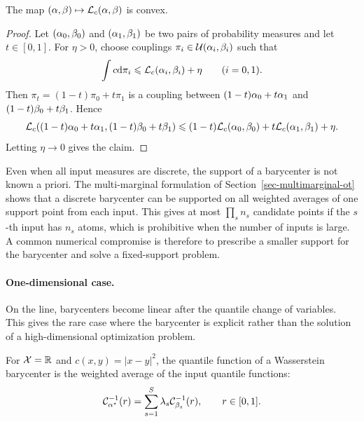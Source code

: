 \begin{prop}\label{prop-barycenter-ot-cost-convexity}
	The map $(\alpha,\beta)\mapsto\mathcal{L}_c(\alpha,\beta)$ is convex.
\end{prop}

\begin{proof}
	Let $(\alpha_0,\beta_0)$ and $(\alpha_1,\beta_1)$ be two pairs of probability measures and let $t\in[0,1]$. For $\eta>0$, choose couplings $\pi_i\in\mathcal{U}(\alpha_i,\beta_i)$ such that
	\[
		\int c\mathrm{d}\pi_i\leqslant\mathcal{L}_c(\alpha_i,\beta_i)+\eta
		\qquad (i=0,1).
	\]
	Then $\pi_t=(1-t)\pi_0+t\pi_1$ is a coupling between $(1-t)\alpha_0+t\alpha_1$ and $(1-t)\beta_0+t\beta_1$. Hence
	\[
		\mathcal{L}_c((1-t)\alpha_0+t\alpha_1,(1-t)\beta_0+t\beta_1)
		\leqslant
		(1-t)\mathcal{L}_c(\alpha_0,\beta_0)+t\mathcal{L}_c(\alpha_1,\beta_1)+\eta.
	\]
	Letting $\eta\to0$ gives the claim.
\end{proof}

Even when all input measures are discrete, the support of a barycenter is not known a priori. The multi-marginal formulation of Section~\ref{sec-multimarginal-ot} shows that a discrete barycenter can be supported on all weighted averages of one support point from each input. This gives at most $\prod_s n_s$ candidate points if the $s$-th input has $n_s$ atoms, which is prohibitive when the number of inputs is large. A common numerical compromise is therefore to prescribe a smaller support for the barycenter and solve a fixed-support problem.

\paragraph{One-dimensional case.}

On the line, barycenters become linear after the quantile change of variables. This gives the rare case where the barycenter is explicit rather than the solution of a high-dimensional optimization problem.

\begin{prop}\label{prop-quantile-barycenters}
	For $\mathcal{X}=\mathbb{R}$ and $c(x,y)=|x-y|^2$, the quantile function of a Wasserstein barycenter is the weighted average of the input quantile functions:
	\[
		\mathcal{C}_{\alpha^\star}^{-1}(r)
		=
		\sum_{s=1}^S\lambda_s\mathcal{C}_{\beta_s}^{-1}(r),
		\qquad r\in[0,1].
	\]
\end{prop}

